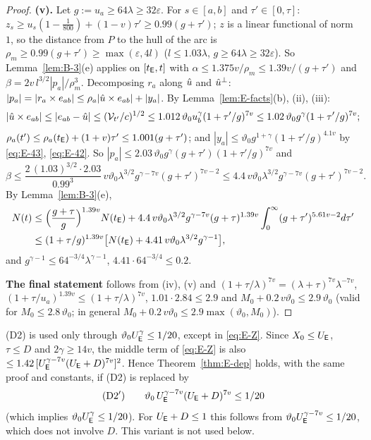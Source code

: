 \begin{proof}
\textbf{(v).} Let $g:=u_a\ge64\lambda\ge32\varepsilon$. For $s\in[a,b]$ and $\tau'\in[0,\tau]$:
$z_s\ge u_s(1-\frac1{800})+(1-v)\tau'\ge0.99(g+\tau')$; $z$ is a linear functional of norm $1$, so the distance from $P$ to the hull
of the arc is $\rho_m\ge0.99(g+\tau')\ge\max(\varepsilon,4l)$ ($l\le1.03\lambda$, $g\ge64\lambda\ge32\varepsilon$). So
Lemma~\ref{lem:B-3}(e) applies on $[t_{\mathsf E},t]$ with $\alpha\le1.375v/\rho_m\le1.39v/(g+\tau')$ and
$\beta=2v\,l^{3/2}|p_a|/\rho_m^3$. Decomposing $r_a$ along $\hat u$ and $\hat u^\perp$:
$|p_a|=|r_a\times e_{ab}|\le\rho_a|\hat u\times e_{ab}|+|y_a|$. By Lemma~\ref{lem:E-facts}(b), (ii), (iii):
\[
|\hat u\times e_{ab}|\le|e_{ab}-\hat u|\le(\mathcal V_{t'}/c)^{1/2}\le1.012\,\vartheta_0u_b^\gamma(1+\tau'/g)^{7v}\le1.02\,\vartheta_0g^\gamma(1+\tau'/g)^{7v};
\]
$\rho_a(t')\le\rho_a(t_{\mathsf E})+(1+v)\tau'\le1.001(g+\tau')$; and $|y_a|\le\vartheta_0g^{1+\gamma}(1+\tau'/g)^{4.1v}$ by \eqref{eq:E-43},
\eqref{eq:E-42}. So $|p_a|\le2.03\,\vartheta_0g^\gamma(g+\tau')(1+\tau'/g)^{7v}$ and
\[
\beta\le\frac{2\,(1.03)^{3/2}\cdot2.03}{0.99^3}\,v\vartheta_0\lambda^{3/2}g^{\gamma-7v}(g+\tau')^{7v-2}
\le4.4\,v\vartheta_0\lambda^{3/2}g^{\gamma-7v}(g+\tau')^{7v-2}.
\]
By Lemma~\ref{lem:B-3}(e),
\begin{align*}
N(t)&\le\Bigl(\frac{g+\tau}g\Bigr)^{1.39v}N(t_{\mathsf E})+4.4\,v\vartheta_0\lambda^{3/2}g^{\gamma-7v}(g+\tau)^{1.39v}\int_0^\infty(g+\tau')^{5.61v-2}d\tau'\\
&\le(1+\tau/g)^{1.39v}\bigl[N(t_{\mathsf E})+4.41\,v\vartheta_0\lambda^{3/2}g^{\gamma-1}\bigr],
\end{align*}
and $g^{\gamma-1}\le64^{-3/4}\lambda^{\gamma-1}$, $4.41\cdot64^{-3/4}\le0.2$.

\textbf{The final statement} follows from (iv), (v) and $(1+\tau/\lambda)^{7v}=(\lambda+\tau)^{7v}\lambda^{-7v}$,
$(1+\tau/u_a)^{1.39v}\le(1+\tau/\lambda)^{7v}$, $1.01\cdot2.84\le2.9$ and $M_0+0.2\,v\vartheta_0\le2.9\,\vartheta_0$ (valid for
$M_0\le2.8\,\vartheta_0$; in general $M_0+0.2\,v\vartheta_0\le2.9\max(\vartheta_0,M_0)$).
\end{proof}

\begin{remark}\label{rem:E-D2}
(D2) is used only through $\vartheta_0U_{\mathsf E}^\gamma\le1/20$, except in \eqref{eq:E-Z}. Since $X_0\le U_{\mathsf E}$, $\tau\le D$ and
$2\gamma\ge14v$, the middle term of \eqref{eq:E-Z} is also $\le1.42\,[U_{\mathsf E}^{\gamma-7v}(U_{\mathsf E}+D)^{7v}]^2$. Hence
Theorem~\ref{thm:E-dep} holds, with the same proof and constants, if (D2) is replaced by
\[
\textup{(D2$'$)}\qquad\vartheta_0\,U_{\mathsf E}^{\gamma-7v}(U_{\mathsf E}+D)^{7v}\le1/20
\]
(which implies $\vartheta_0U_{\mathsf E}^\gamma\le1/20$). For $U_{\mathsf E}+D\le1$ this follows from $\vartheta_0U_{\mathsf E}^{\gamma-7v}\le1/20$, which
does not involve $D$. This variant is not used below.
\end{remark}

